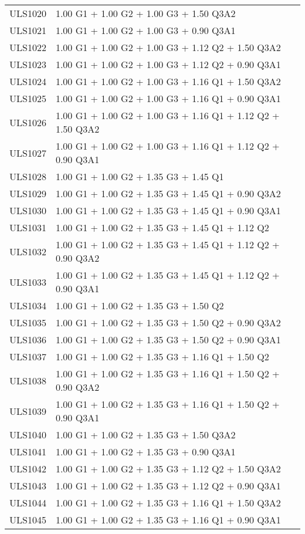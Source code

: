 \begin{center}
\begin{small}
\begin{longtable}{|l|p{10cm}|}
ULS1020 & 1.00 G1 + 1.00 G2 + 1.00 G3 + 1.50 Q3A2\\
ULS1021 & 1.00 G1 + 1.00 G2 + 1.00 G3 + 0.90 Q3A1\\
ULS1022 & 1.00 G1 + 1.00 G2 + 1.00 G3 + 1.12 Q2 + 1.50 Q3A2\\
ULS1023 & 1.00 G1 + 1.00 G2 + 1.00 G3 + 1.12 Q2 + 0.90 Q3A1\\
ULS1024 & 1.00 G1 + 1.00 G2 + 1.00 G3 + 1.16 Q1 + 1.50 Q3A2\\
ULS1025 & 1.00 G1 + 1.00 G2 + 1.00 G3 + 1.16 Q1 + 0.90 Q3A1\\
ULS1026 & 1.00 G1 + 1.00 G2 + 1.00 G3 + 1.16 Q1 + 1.12 Q2 + 1.50 Q3A2\\
ULS1027 & 1.00 G1 + 1.00 G2 + 1.00 G3 + 1.16 Q1 + 1.12 Q2 + 0.90 Q3A1\\
ULS1028 & 1.00 G1 + 1.00 G2 + 1.35 G3 + 1.45 Q1\\
ULS1029 & 1.00 G1 + 1.00 G2 + 1.35 G3 + 1.45 Q1 + 0.90 Q3A2\\
ULS1030 & 1.00 G1 + 1.00 G2 + 1.35 G3 + 1.45 Q1 + 0.90 Q3A1\\
ULS1031 & 1.00 G1 + 1.00 G2 + 1.35 G3 + 1.45 Q1 + 1.12 Q2\\
ULS1032 & 1.00 G1 + 1.00 G2 + 1.35 G3 + 1.45 Q1 + 1.12 Q2 + 0.90 Q3A2\\
ULS1033 & 1.00 G1 + 1.00 G2 + 1.35 G3 + 1.45 Q1 + 1.12 Q2 + 0.90 Q3A1\\
ULS1034 & 1.00 G1 + 1.00 G2 + 1.35 G3 + 1.50 Q2\\
ULS1035 & 1.00 G1 + 1.00 G2 + 1.35 G3 + 1.50 Q2 + 0.90 Q3A2\\
ULS1036 & 1.00 G1 + 1.00 G2 + 1.35 G3 + 1.50 Q2 + 0.90 Q3A1\\
ULS1037 & 1.00 G1 + 1.00 G2 + 1.35 G3 + 1.16 Q1 + 1.50 Q2\\
ULS1038 & 1.00 G1 + 1.00 G2 + 1.35 G3 + 1.16 Q1 + 1.50 Q2 + 0.90 Q3A2\\
ULS1039 & 1.00 G1 + 1.00 G2 + 1.35 G3 + 1.16 Q1 + 1.50 Q2 + 0.90 Q3A1\\
ULS1040 & 1.00 G1 + 1.00 G2 + 1.35 G3 + 1.50 Q3A2\\
ULS1041 & 1.00 G1 + 1.00 G2 + 1.35 G3 + 0.90 Q3A1\\
ULS1042 & 1.00 G1 + 1.00 G2 + 1.35 G3 + 1.12 Q2 + 1.50 Q3A2\\
ULS1043 & 1.00 G1 + 1.00 G2 + 1.35 G3 + 1.12 Q2 + 0.90 Q3A1\\
ULS1044 & 1.00 G1 + 1.00 G2 + 1.35 G3 + 1.16 Q1 + 1.50 Q3A2\\
ULS1045 & 1.00 G1 + 1.00 G2 + 1.35 G3 + 1.16 Q1 + 0.90 Q3A1\\

\end{longtable}
\end{small}
\end{center}
